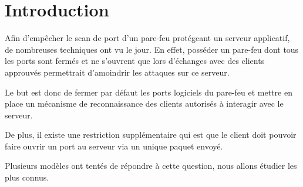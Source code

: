 \chapter*{Introduction}

Afin d'empêcher le scan de port d'un pare-feu protégeant un serveur applicatif, de nombreuses techniques ont vu le jour. En effet, posséder un pare-feu dont tous les ports sont fermés et ne s'ouvrent que lors d'échanges avec des clients approuvés permettrait d'amoindrir les attaques sur ce serveur.

Le but est donc de fermer par défaut les ports logiciels du pare-feu et mettre en place un mécanisme de reconnaissance des clients autorisés à interagir avec le serveur.

De plus, il existe une restriction supplémentaire qui est que le client doit pouvoir faire ouvrir un port au serveur via un unique paquet envoyé.

Plusieurs modèles ont tentés de répondre à cette question, nous allons étudier les plus connus.
